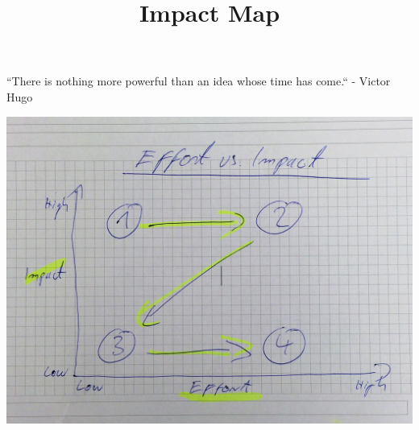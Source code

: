 \documentclass{ximera}
\title{Impact Map}
\begin{document}
\begin{abstract}

\end{abstract}
\maketitle

``There is nothing more powerful than an idea whose time has come.`` - Victor Hugo



\begin{image}
\includegraphics{e_vs_i.jpg}
\end{image}
\end{document}
